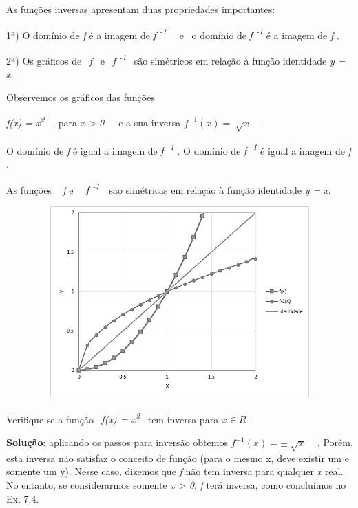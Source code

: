 \begin{caixa}
As funções inversas apresentam duas propriedades importantes:

1ª) O domínio de \textit{f }é a imagem de \textit{f \textsuperscript{-1}}~~ e~ o domínio de \textit{f \textsuperscript{-1}} é a imagem de \textit{f} .

2ª) Os gráficos de~ \textit{f }~e~  \textit{f \textsuperscript{-1}}~ são simétricos em relação à função identidade \textit{y = x}.~ 

\end{caixa}

\begin{texemplo}
    Observemos os gráficos das funções 

    \textit{f(x) = x\textsuperscript{2}}~ , para \textit{x > 0}~~~e a sua inversa   \( f^{-1} \left( x \right) =\sqrt[]{x} \) ~ . 

    O domínio de \textit{f }é igual a imagem de \textit{f \textsuperscript{-1}} . O domínio de \textit{f \textsuperscript{-1}} é igual a imagem de \textit{f} .

    As funções ~ \textit{f } e~~ \textit{f \textsuperscript{-1}}~~são simétricas em relação à função identidade  \textit{y = x}.~~ \qedsymbol{} 

\begin{figure}[H]
	\begin{Center}
		\includegraphics[width=4.67in,height=2.9in]{capitulos/logaritmos_e_funcao_logaritmica/media/image3.png}
	\end{Center}
\end{figure}

\end{texemplo}

\begin{texemplo}
    Verifique se a função~ \textit{f(x) = x\textsuperscript{2}}~ tem inversa para \textit{  \( x  \in  R  \) } . 

    \textbf{Solução}: aplicando os passos para inversão obtemos  \( f^{-1} \left( x \right) = \pm \sqrt[]{x} \) ~ . Porém, esta inversa não satisfaz o conceito de função (para o mesmo x, deve existir um e somente um y). Nesse caso, dizemos que \textit{f} não tem inversa para qualquer \textit{x} real. No entanto, se considerarmos somente \textit{x > 0}, \textit{f }terá inversa, como concluímos no Ex. 7.4. \qedsymbol{}
\end{texemplo}

